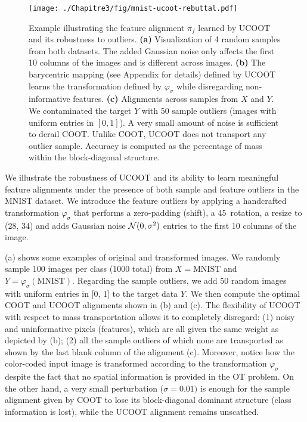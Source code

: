 \begin{figure}[t]
  \centering
  \texttt{[image: ./Chapitre3/fig/mnist-ucoot-rebuttal.pdf]}
  \caption[Example illustrating the feature alignment $\pi_f$ learned by UCOOT
  and its robustness to outliers]{Example illustrating the feature alignment $\pi_f$ learned by UCOOT
  and its robustness to outliers.
  \textbf{(a)} Visualization of 4 random samples from both datasets.
  The added Gaussian noise only affects the first 10 columns of the images
  and is different across images.
  \textbf{(b)} The barycentric mapping (see Appendix for details)
  defined by UCOOT learns the transformation defined by $\varphi_\sigma$
  while disregarding non-informative features.
  \textbf{(c)} Alignments across samples from $X$ and $Y$.
  We contaminated the target $Y$ with 50 sample outliers
  (images with uniform entries in $[0,1]$).
  A very small amount of noise is sufficient to derail COOT.
  Unlike COOT, UCOOT does not transport any outlier sample.
  Accuracy is computed as the percentage of mass within the block-diagonal structure.
  \label{f:mnist-example}}
\end{figure}
We illustrate the robustness of UCOOT and its ability to learn meaningful feature alignments
under the presence of both sample and feature outliers in the MNIST dataset.
We introduce the feature outliers by applying a handcrafted transformation $\varphi_\sigma$
that performs a zero-padding (shift), a 45\textdegree\ rotation,
a resize to (28, 34) and adds Gaussian noise $\mathcal N(0, \sigma^2)$ entries
to the first 10 columns of the image.

 (a) shows some examples of original and transformed images.
We randomly sample 100 images per class (1000 total) from $X = \text{MNIST}$ and
$Y = \varphi_{\sigma}(\text{MNIST})$. Regarding the sample outliers,
we add 50 random images with uniform entries in [0, 1] to the target data $Y$.
We then compute the optimal COOT and UCOOT alignments shown in
 (b) and (c).
The flexibility of UCOOT with respect to mass transportation allows it to completely disregard:
(1) noisy and uninformative pixels (features),
which are all given the same weight as depicted by (b);
(2) all the sample outliers of which none are transported as shown
by the last blank column of the alignment (c).
Moreover, notice how the color-coded input image is transformed according to
the transformation $\varphi_{\sigma}$ despite the fact that
no spatial information is provided in the OT problem. On the other hand,
a very small perturbation ($\sigma = 0.01)$ is enough for the sample alignment
given by COOT to lose its block-diagonal dominant structure (class information is lost),
while the UCOOT alignment remains unscathed.

